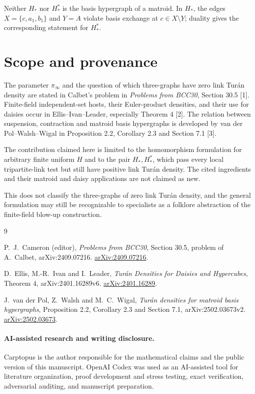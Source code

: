 \documentclass[11pt]{article}
\numberwithin{equation}{section}
\begin{document}
Neither $H_*$ nor $H_*^*$ is the basis hypergraph of a matroid. In $H_*$, the edges
$X=\{c,a_1,b_1\}$ and $Y=A$ violate basis exchange at $c\in X\setminus Y$; duality gives the
corresponding statement for $H_*^*$.

\section{Scope and provenance}


The parameter $\pi_\infty$ and the question of which three-graphs have zero link Tur\'an density are
stated in Calbet's problem in \emph{Problems from BCC30}, Section 30.5 [1]. Finite-field independent-set
hosts, their Euler-product densities, and their use for daisies occur in Ellis--Ivan--Leader,
especially Theorem 4 [2]. The relation between suspension, contraction and matroid basis
hypergraphs is developed by van der Pol--Walsh--Wigal in Proposition 2.2, Corollary 2.3 and
Section 7.1 [3].

The contribution claimed here is limited to the homomorphism formulation for arbitrary finite
uniform $H$ and to the pair $H_*,H_*^*$, which pass every local tripartite-link test but still have
positive link Tur\'an density. The cited ingredients and their matroid and daisy applications are not
claimed as new.

This does not classify the three-graphs of zero link Tur\'an density, and the general formulation may
still be recognizable to specialists as a folklore abstraction of the finite-field blow-up
construction.

\begin{thebibliography}{9}
\footnotesize
\raggedright

P.~J.~Cameron (editor),
\emph{Problems from BCC30}, Section 30.5, problem of A.~Calbet,
arXiv:2409.07216.
\href{https://arxiv.org/abs/2409.07216}{arXiv:2409.07216}.

D.~Ellis, M.-R.~Ivan and I.~Leader,
\emph{Tur\'an Densities for Daisies and Hypercubes},
Theorem 4, arXiv:2401.16289v6.
\href{https://arxiv.org/abs/2401.16289}{arXiv:2401.16289}.

J.~van der Pol, Z.~Walsh and M.~C.~Wigal,
\emph{Tur\'an densities for matroid basis hypergraphs},
Proposition 2.2, Corollary 2.3 and Section 7.1, arXiv:2502.03673v2.
\href{https://arxiv.org/abs/2502.03673}{arXiv:2502.03673}.

\end{thebibliography}

\paragraph{AI-assisted research and writing disclosure.}
Carptopus is the author responsible for the mathematical claims and the public version of this
manuscript. OpenAI Codex was used as an AI-assisted tool for literature organization, proof
development and stress testing, exact verification, adversarial auditing, and manuscript
preparation.
\end{document}

